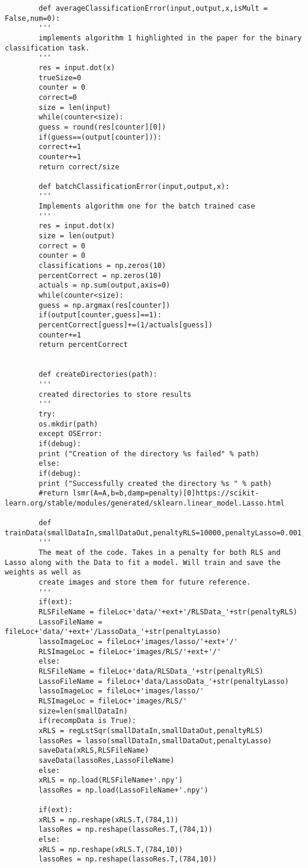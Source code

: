 \documentclass[12pt]{article}
\begin{document}
\begin{verbatim}
		def averageClassificationError(input,output,x,isMult = False,num=0):
		'''
		implements algorithm 1 highlighted in the paper for the binary classification task.
		'''
		res = input.dot(x)
		trueSize=0
		counter = 0
		correct=0
		size = len(input)
		while(counter<size):
		guess = round(res[counter][0])
		if(guess==(output[counter])):
		correct+=1
		counter+=1
		return correct/size
		
		def batchClassificationError(input,output,x):
		'''
		Implements algorithm one for the batch trained case
		'''
		res = input.dot(x)
		size = len(output)
		correct = 0
		counter = 0
		classifications = np.zeros(10)
		percentCorrect = np.zeros(10)
		actuals = np.sum(output,axis=0)
		while(counter<size):
		guess = np.argmax(res[counter])
		if(output[counter,guess]==1):
		percentCorrect[guess]+=(1/actuals[guess])
		counter+=1
		return percentCorrect
		
		
		def createDirectories(path):
		'''
		created directories to store results
		'''
		try:
		os.mkdir(path)
		except OSError:
		if(debug):
		print ("Creation of the directory %s failed" % path)
		else:
		if(debug):
		print ("Successfully created the directory %s " % path)
		#return lsmr(A=A,b=b,damp=penalty)[0]https://scikit-learn.org/stable/modules/generated/sklearn.linear_model.Lasso.html
		
		def trainData(smallDataIn,smallDataOut,penaltyRLS=10000,penaltyLasso=0.001,recompData=False,fileLoc=None,savefile=False,ext=""):
		'''
		The meat of the code. Takes in a penalty for both RLS and Lasso along with the Data to fit a model. Will train and save the weights as well as
		create images and store them for future reference.
		'''
		if(ext):
		RLSFileName = fileLoc+'data/'+ext+'/RLSData_'+str(penaltyRLS)
		LassoFileName = fileLoc+'data/'+ext+'/LassoData_'+str(penaltyLasso)
		lassoImageLoc = fileLoc+'images/lasso/'+ext+'/'
		RLSImageLoc = fileLoc+'images/RLS/'+ext+'/'
		else:
		RLSFileName = fileLoc+'data/RLSData_'+str(penaltyRLS)
		LassoFileName = fileLoc+'data/LassoData_'+str(penaltyLasso)
		lassoImageLoc = fileLoc+'images/lasso/'
		RLSImageLoc = fileLoc+'images/RLS/'
		size=len(smallDataIn)
		if(recompData is True):
		xRLS = regLstSqr(smallDataIn,smallDataOut,penaltyRLS)
		lassoRes = lasso(smallDataIn,smallDataOut,penaltyLasso)
		saveData(xRLS,RLSFileName)
		saveData(lassoRes,LassoFileName)
		else:
		xRLS = np.load(RLSFileName+'.npy')
		lassoRes = np.load(LassoFileName+'.npy')
		
		if(ext):
		xRLS = np.reshape(xRLS.T,(784,1))
		lassoRes = np.reshape(lassoRes.T,(784,1))
		else:
		xRLS = np.reshape(xRLS.T,(784,10))
		lassoRes = np.reshape(lassoRes.T,(784,10))
		

\end{verbatim}
\end{document}
